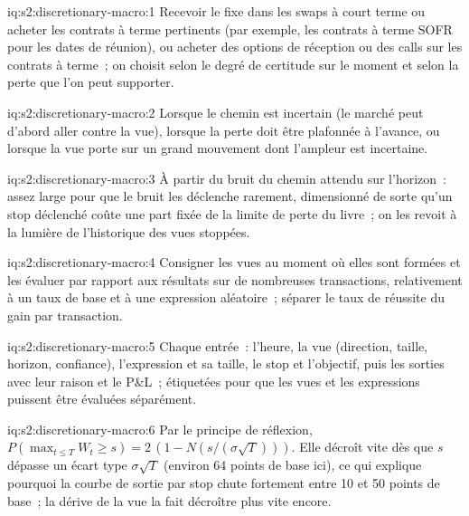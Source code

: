 \begin{solution}{iq:s2:discretionary-macro:1}
Recevoir le fixe dans les swaps à court terme ou acheter les contrats à terme pertinents (par exemple, les contrats à terme SOFR pour les dates de réunion), ou acheter des options de réception ou des calls sur
les contrats à terme~; on choisit selon le degré de certitude sur le moment et selon la perte que l'on peut supporter.
\end{solution}

\begin{solution}{iq:s2:discretionary-macro:2}
Lorsque le chemin est incertain (le marché peut d'abord aller contre la vue), lorsque la perte doit être plafonnée à l'avance, ou lorsque la vue porte sur un grand
mouvement dont l'ampleur est incertaine.
\end{solution}

\begin{solution}{iq:s2:discretionary-macro:3}
À partir du bruit du chemin attendu sur l'horizon~: assez large pour que le bruit les déclenche rarement, dimensionné de sorte qu'un stop déclenché coûte une part fixée de la
limite de perte du livre~; on les revoit à la lumière de l'historique des vues stoppées.
\end{solution}

\begin{solution}{iq:s2:discretionary-macro:4}
Consigner les vues au moment où elles sont formées et les évaluer par rapport aux résultats sur de nombreuses transactions, relativement à un taux de base et à une expression aléatoire~; séparer le taux de réussite du
gain par transaction.
\end{solution}

\begin{solution}{iq:s2:discretionary-macro:5}
Chaque entrée~: l'heure, la vue (direction, taille, horizon, confiance), l'expression et sa taille, le stop et l'objectif, puis les sorties avec leur raison et le P\&L~; étiquetées pour que les vues
et les expressions puissent être évaluées séparément.
\end{solution}

\begin{solution}{iq:s2:discretionary-macro:6}
Par le principe de réflexion, $P(\max_{t \le T} W_t \ge s) = 2\,(1 - N(s/(\sigma\sqrt T)))$. Elle décroît vite dès que $s$ dépasse un écart type
$\sigma\sqrt T$ (environ 64 points de base ici), ce qui explique pourquoi la courbe de sortie par stop chute fortement entre 10 et 50 points de base~; la dérive de la vue la fait
décroître plus vite encore.
\end{solution}
